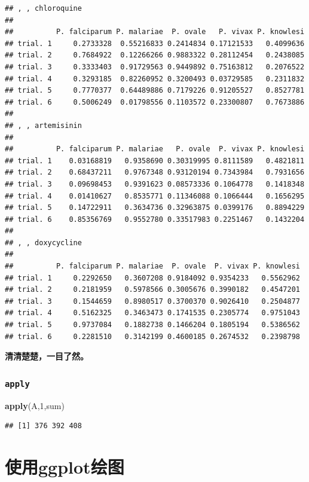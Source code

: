 \documentclass[]{book}
\newenvironment{Shaded}{\begin{snugshade}}{\end{snugshade}}
\newcommand{\DecValTok}[1]{\textcolor[rgb]{0.00,0.00,0.81}{#1}}
\newcommand{\KeywordTok}[1]{\textcolor[rgb]{0.13,0.29,0.53}{\textbf{#1}}}
\newcommand{\NormalTok}[1]{#1}
\begin{document}
\begin{verbatim}
## , , chloroquine
## 
##          P. falciparum P. malariae  P. ovale   P. vivax P. knowlesi
## trial. 1     0.2733328  0.55216833 0.2414834 0.17121533   0.4099636
## trial. 2     0.7684922  0.12266266 0.9883322 0.28112454   0.2438085
## trial. 3     0.3333403  0.91729563 0.9449892 0.75163812   0.2076522
## trial. 4     0.3293185  0.82260952 0.3200493 0.03729585   0.2311832
## trial. 5     0.7770377  0.64489886 0.7179226 0.91205527   0.8527781
## trial. 6     0.5006249  0.01798556 0.1103572 0.23300807   0.7673886
## 
## , , artemisinin
## 
##          P. falciparum P. malariae   P. ovale  P. vivax P. knowlesi
## trial. 1    0.03168819   0.9358690 0.30319995 0.8111589   0.4821811
## trial. 2    0.68437211   0.9767348 0.93120194 0.7343984   0.7931656
## trial. 3    0.09698453   0.9391623 0.08573336 0.1064778   0.1418348
## trial. 4    0.01410627   0.8535771 0.11346088 0.1066444   0.1656295
## trial. 5    0.14722911   0.3634736 0.32963875 0.0399176   0.8894229
## trial. 6    0.85356769   0.9552780 0.33517983 0.2251467   0.1432204
## 
## , , doxycycline
## 
##          P. falciparum P. malariae  P. ovale  P. vivax P. knowlesi
## trial. 1     0.2292650   0.3607208 0.9184092 0.9354233   0.5562962
## trial. 2     0.2181959   0.5978566 0.3005676 0.3990182   0.4547201
## trial. 3     0.1544659   0.8980517 0.3700370 0.9026410   0.2504877
## trial. 4     0.5162325   0.3463473 0.1741535 0.2305774   0.9751043
## trial. 5     0.9737084   0.1882738 0.1466204 0.1805194   0.5386562
## trial. 6     0.2281510   0.3142199 0.4600185 0.2674532   0.2398798
\end{verbatim}

\textbf{清清楚楚，一目了然。}

\hypertarget{apply}{%
\subsection{\texorpdfstring{\texttt{apply}}{apply}}\label{apply}}

\begin{Shaded}
\begin{Highlighting}[]
\KeywordTok{apply}\NormalTok{(A,}\DecValTok{1}\NormalTok{,sum)}
\end{Highlighting}
\end{Shaded}

\begin{verbatim}
## [1] 376 392 408
\end{verbatim}

\hypertarget{graphics}{%
\chapter{使用ggplot绘图}\label{graphics}}
\end{document}
